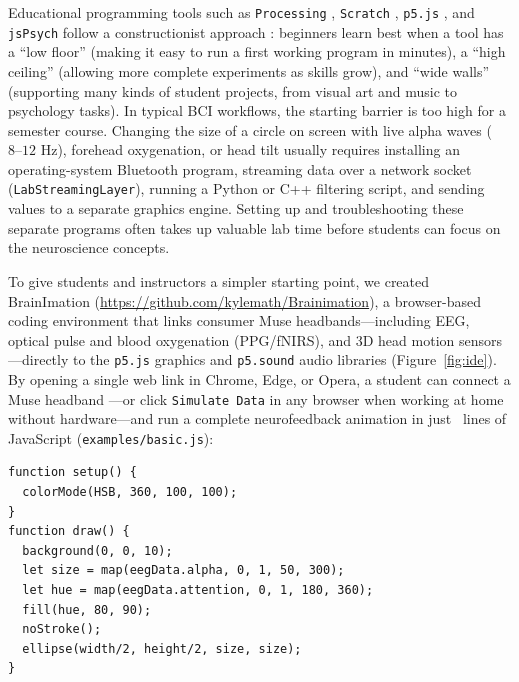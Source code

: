 \documentclass[11pt]{article}
\begin{document}
Educational programming tools such as \texttt{Processing} \citep{reas2007processing}, \texttt{Scratch} \citep{resnick2009scratch}, \texttt{p5.js} \citep{mccarthy2015p5}, and \texttt{jsPsych} \citep{deleeuw2015jspsych} follow a constructionist approach \citep{papert1980mindstorms}: beginners learn best when a tool has a ``low floor'' (making it easy to run a first working program in minutes), a ``high ceiling'' (allowing more complete experiments as skills grow), and ``wide walls'' (supporting many kinds of student projects, from visual art and music to psychology tasks). In typical BCI workflows, the starting barrier is too high for a semester course. Changing the size of a circle on screen with live alpha waves ($8\text{--}12\text{ Hz}$), forehead oxygenation, or head tilt usually requires installing an operating-system Bluetooth program, streaming data over a network socket (\texttt{LabStreamingLayer}), running a Python or C++ filtering script, and sending values to a separate graphics engine. Setting up and troubleshooting these separate programs often takes up valuable lab time before students can focus on the neuroscience concepts.

To give students and instructors a simpler starting point, we created BrainImation (\url{https://github.com/kylemath/Brainimation}), a browser-based coding environment that links consumer Muse headbands---including EEG, optical pulse and blood oxygenation (PPG/fNIRS), and 3D head motion sensors---directly to the \texttt{p5.js} graphics and \texttt{p5.sound} audio libraries \citep{mccarthy2015p5} (Figure~\ref{fig:ide}). By opening a single web link in Chrome, Edge, or Opera, a student can connect a Muse headband \citep{krigolson2017choosing,kuziek2017transitioning,kuziek2018increasing}---or click \texttt{Simulate Data} in any browser when working at home without hardware---and run a complete neurofeedback animation in just \ExLOCMin~lines of JavaScript (\texttt{examples/basic.js}):

\noindent\begin{minipage}{\textwidth}
\begin{lstlisting}
function setup() {
  colorMode(HSB, 360, 100, 100);
}
function draw() {
  background(0, 0, 10);
  let size = map(eegData.alpha, 0, 1, 50, 300);
  let hue = map(eegData.attention, 0, 1, 180, 360);
  fill(hue, 80, 90);
  noStroke();
  ellipse(width/2, height/2, size, size);
}
\end{lstlisting}
\end{minipage}
\vspace{4pt}
\end{document}
